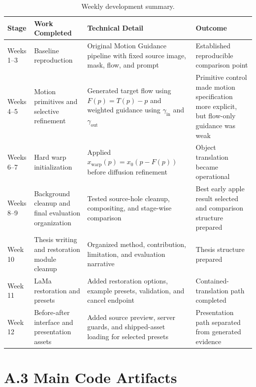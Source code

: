 \begin{table}[p]
  \centering
  \scriptsize
  \caption{Weekly development summary.}
  \label{tab:appendix-weekly-log}
  \renewcommand{\arraystretch}{1.12}
  \begin{tabular}{p{0.65in}|p{1.45in}|p{1.65in}|p{1.35in}}
    \hline
    \textbf{Stage} & \textbf{Work Completed} & \textbf{Technical Detail} & \textbf{Outcome} \\ \hline \hline
    Weeks 1--3 & Baseline reproduction & Original Motion Guidance pipeline with fixed source image, mask, flow, and prompt & Established reproducible comparison point \\ \hline
    Weeks 4--5 & Motion primitives and selective refinement & Generated target flow using $F(p)=T(p)-p$ and weighted guidance using $\gamma_{\mathrm{in}}$ and $\gamma_{\mathrm{out}}$ & Primitive control made motion specification more explicit, but flow-only guidance was weak \\ \hline
    Weeks 6--7 & Hard warp initialization & Applied $x_{\mathrm{warp}}(p)=x_0(p-F(p))$ before diffusion refinement & Object translation became operational \\ \hline
    Weeks 8--9 & Background cleanup and final evaluation organization & Tested source-hole cleanup, compositing, and stage-wise comparison & Best early apple result selected and comparison structure prepared \\ \hline
    Week 10 & Thesis writing and restoration module cleanup & Organized method, contribution, limitation, and evaluation narrative & Thesis structure prepared \\ \hline
    Week 11 & LaMa restoration and presets & Added restoration options, example presets, validation, and cancel endpoint & Contained-translation path completed \\ \hline
    Week 12 & Before-after interface and presentation assets & Added source preview, server guards, and shipped-asset loading for selected presets & Presentation path separated from generated evidence \\ \hline
  \end{tabular}
\end{table}

\section*{A.3 Main Code Artifacts}

